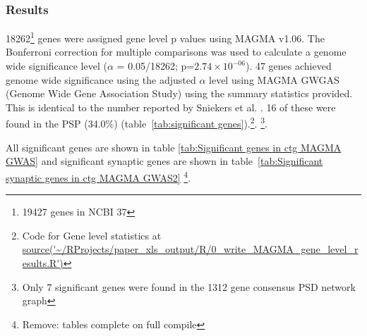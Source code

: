 





\subsubsection{Results}
18262\footnote{19427 genes in NCBI 37} genes were assigned gene level p values using MAGMA v1.06.
The Bonferroni correction for multiple comparisons was used to calculate a genome wide significance level ($\alpha$ = 0.05/18262; p=$2.74 \times 10^{-06}$). 47 genes achieved genome wide significance using the adjusted $\alpha$ level using MAGMA GWGAS (Genome Wide Gene Association Study) using the summary statistics provided. This is identical to the number reported by Sniekers et al. \cite{sniekers2017genome}. 16 of these were found in the PSP (34.0\%)  (table~\ref{tab:significant genes}).\footnote{Code for Gene level statistics at \url{source('~/RProjects/paper_xls_output/R/0_write_MAGMA_gene_level_results.R')}}. \footnote{Only 7 significant genes were found in the 1312 gene consensus PSD network graph\cite{mclean2016improved}}. 

All significant genes are shown in table \ref{tab:Significant genes in ctg MAGMA GWAS} and significant synaptic genes are shown in table~\ref{tab:Significant synaptic genes in ctg MAGMA GWAS2} \footnote{Remove: tables complete on full compile}.

